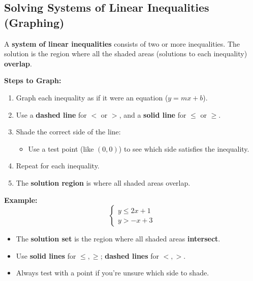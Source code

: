 \documentclass[11pt]{article}
\begin{document}
\subsection{Solving Systems of Linear Inequalities (Graphing)}

A \textbf{system of linear inequalities} consists of two or more inequalities. The solution is the region where all the shaded areas (solutions to each inequality) \textbf{overlap}.

\textbf{Steps to Graph:}
\begin{enumerate}
  \item Graph each inequality as if it were an equation (\( y = mx + b \)).
  \item Use a \textbf{dashed line} for \( < \) or \( > \), and a \textbf{solid line} for \( \leq \) or \( \geq \).
  \item Shade the correct side of the line:
  \begin{itemize}
    \item Use a test point (like \( (0, 0) \)) to see which side satisfies the inequality.
  \end{itemize}
  \item Repeat for each inequality.
  \item The \textbf{solution region} is where all shaded areas overlap.
\end{enumerate}

\textbf{Example:}
\[
\begin{cases}
y \leq 2x + 1 \\
y > -x + 3
\end{cases}
\]

\begin{center}
\end{center}

\begin{tcolorbox}[colback=green!5!white, colframe=green!80!black, title=Graphing Systems of Inequalities]
\begin{itemize}
  \item The \textbf{solution set} is the region where all shaded areas \textbf{intersect}.
  \item Use \textbf{solid lines} for \( \leq, \geq \); \textbf{dashed lines} for \( <, > \).
  \item Always test with a point if you're unsure which side to shade.
\end{itemize}
\end{tcolorbox}
\end{document}

